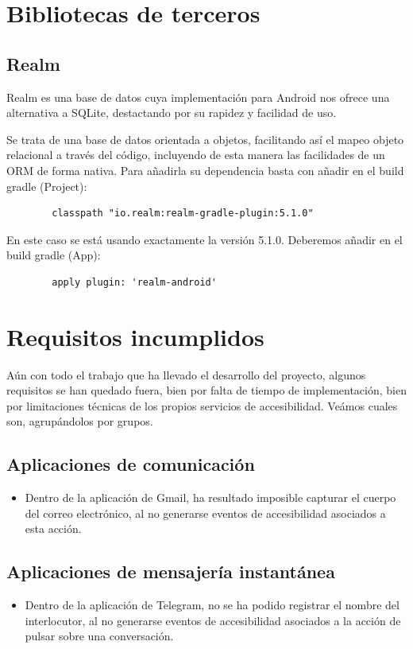 \documentclass[12pt,a4paper,oneside]{book} %
\begin{document}
\section{Bibliotecas de terceros}
\subsection{Realm}
Realm es una base de datos cuya implementación para Android nos ofrece una alternativa a SQLite, destactando por su rapidez y facilidad de uso. 

Se trata de una base de datos orientada a objetos, facilitando así el mapeo objeto relacional a través del código, incluyendo de esta manera las facilidades de un ORM de forma nativa. 
\newline \newline
Para añadirla su dependencia basta con añadir en el build gradle (Project): 
\begin{verbatim}
		classpath "io.realm:realm-gradle-plugin:5.1.0"
\end{verbatim}
En este caso se está usando exactamente la versión 5.1.0. Deberemos añadir en el build gradle (App): 
\begin{verbatim}
		apply plugin: 'realm-android'

\end{verbatim}
\section{Requisitos incumplidos}
Aún con todo el trabajo que ha llevado el desarrollo del proyecto, algunos requisitos se han quedado fuera, bien por falta de tiempo de implementación, bien por limitaciones técnicas de los propios servicios de accesibilidad. Veámos cuales son, agrupándolos por grupos. 
\subsection{Aplicaciones de comunicación}
\begin{itemize}
\item Dentro de la aplicación de Gmail, ha resultado imposible capturar el cuerpo del correo electrónico, al no generarse eventos de accesibilidad asociados a esta acción. 
\end{itemize}
\subsection{Aplicaciones de mensajería instantánea}
\begin{itemize}
\item Dentro de la aplicación de Telegram, no se ha podido registrar el nombre del interlocutor, al no generarse eventos de accesibilidad asociados a la acción de pulsar sobre una conversación. 
\end{itemize}
\end{document}
